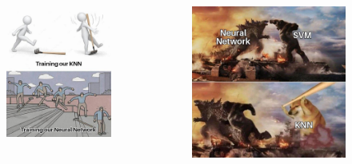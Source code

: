 \documentclass[8pt]{beamer}
\begin{document}
\begin{frame}
{\begin{columns}
\begin{figure}
      \includegraphics[scale=0.2]{figures/meme1.jpeg}
    \end{figure}
    \begin{figure}
      \centering
      \includegraphics[scale=0.17]{figures/meme2.jpeg}
    \end{figure}
  \end{columns}
}
\end{frame}
\end{document}
